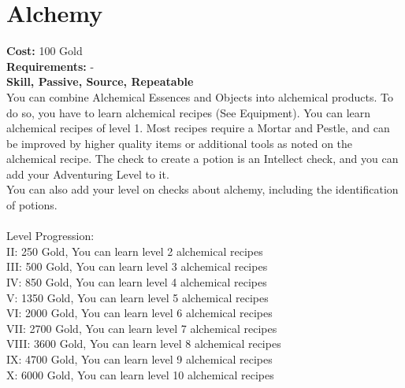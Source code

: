 \section{Alchemy}
\textbf{Cost:} 100 Gold\\
\textbf{Requirements:} -\\
\textbf{Skill, Passive, Source, Repeatable}\\
You can combine Alchemical Essences and Objects into alchemical products. To do so, you have to learn alchemical recipes (See Equipment). You can learn alchemical recipes of level 1. Most recipes require a Mortar and Pestle, and can be improved by higher quality items or additional tools as noted on the alchemical recipe. The check to create a potion is an Intellect check, and you can add your Adventuring Level to it.\\
You can also add your level on checks about alchemy, including the identification of potions.\\
\\
Level Progression:\\
II: 250 Gold, You can learn level 2 alchemical recipes\\
III: 500 Gold, You can learn level 3 alchemical recipes\\
IV: 850 Gold, You can learn level 4 alchemical recipes\\
V: 1350 Gold, You can learn level 5 alchemical recipes\\
VI: 2000 Gold, You can learn level 6 alchemical recipes\\
VII: 2700 Gold, You can learn level 7 alchemical recipes\\
VIII: 3600 Gold, You can learn level 8 alchemical recipes\\
IX: 4700 Gold, You can learn level 9 alchemical recipes\\
X: 6000 Gold, You can learn level 10 alchemical recipes\\